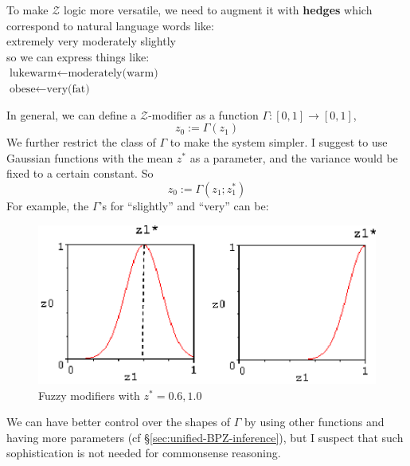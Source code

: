 To make $\mathcal{Z}$ logic more versatile, we need to augment it with \textbf{hedges} which correspond to natural language words like:\\
\hspace*{1cm} extremely \hspace*{1cm} very \hspace*{1cm} moderately \hspace*{1cm} slightly\\
so we can express things like:\\
\hspace*{1cm} $\mbox{lukewarm} \leftarrow \mbox{moderately(warm)}$\\
\hspace*{1cm} $\mbox{obese} \leftarrow \mbox{very(fat)}$

In general, we can define a $\mathcal{Z}$-modifier as a function $\Gamma: [0,1] \rightarrow [0,1]$,
\begin{equation}
z_0 := \Gamma(z_1)
\end{equation}
We further restrict the class of $\Gamma$ to make the system simpler.  I suggest to use Gaussian functions with the mean $z^*$ as a parameter, and the variance would be fixed to a certain constant.  So
\begin{equation}
z_0 := \Gamma(z_1; z^*_1)
\end{equation}
For example, the $\Gamma$'s for ``slightly'' and ``very'' can be:
\begin{figure}[H]
\centering
\includegraphics[scale=0.7]{fuzzy-modifiers.eps}
\caption{Fuzzy modifiers with $z^* = 0.6, 1.0$}
\end{figure}

We can have better control over the shapes of $\Gamma$ by using other functions and having more parameters (cf \S\ref{sec:unified-BPZ-inference}), but I suspect that such sophistication is not needed for commonsense reasoning.

